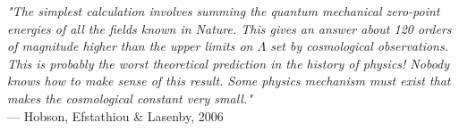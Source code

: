 \begin{flushright}
\emph{"The simplest calculation involves summing the quantum mechanical zero-point energies of all the fields known in Nature. This gives an answer about 120 orders of magnitude higher than the upper limits on \(\Lambda\) set by cosmological observations. This is probably the worst theoretical prediction in the history of physics! Nobody knows how to make sense of this result. Some physics mechanism must exist that makes the cosmological constant very small."}\\
— Hobson, Efstathiou \& Lasenby, 2006
\end{flushright}